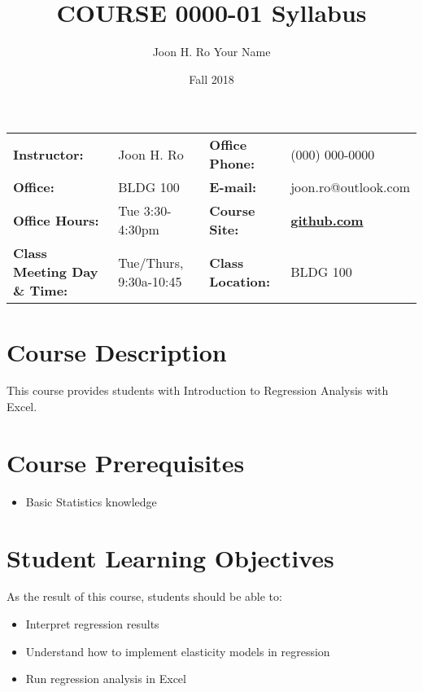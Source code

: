 \documentclass[article,letterpaper,times,10pt,listings-bw,microtype]{scrartcl}
\author{Joon H. Ro Your Name}
\date{Fall 2018}
\title{COURSE 0000-01 Syllabus}
\begin{document}

\begin{center}
{}
\end{center}

\begin{center}
{}
\end{center}

\vspace{5 mm}

\begin{center}
\begin{tabular}{llll}
\textbf{Instructor:} & Joon H. Ro & \textbf{Office Phone:} & (000) 000-0000\\
\textbf{Office:} & BLDG 100 & \textbf{E-mail:} & joon.ro@outlook.com\\
\textbf{Office Hours:} & Tue 3:30-4:30pm & \textbf{Course Site:} & \textbf{\href{https://github.com}{github.com}}\\
\textbf{Class Meeting Day \& Time:} & Tue/Thurs, 9:30a-10:45 & \textbf{Class Location:} & BLDG 100\\
\end{tabular}
\end{center}
\section*{Course Description}
\label{sec:org5fb4d7c}
This course provides students with Introduction to Regression Analysis with
Excel.
\section*{Course Prerequisites}
\label{sec:org479480b}
\begin{itemize}
\item Basic Statistics knowledge
\end{itemize}
\section*{Student Learning Objectives}
\label{sec:org793fa98}
As the result of this course, students should be able to:

\begin{itemize}
\item Interpret regression results
\item Understand how to implement elasticity models in regression
\item Run regression analysis in Excel
\end{itemize}
\end{document}

